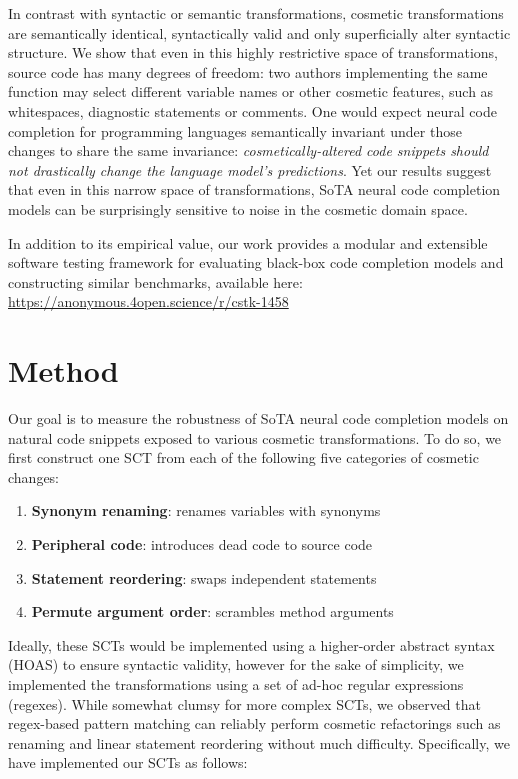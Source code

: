\documentclass[usenames,dvipsnames]{article} %
\begin{document}
  In contrast with syntactic or semantic transformations, cosmetic transformations are semantically identical, syntactically valid and only superficially alter syntactic structure. We show that even in this highly restrictive space of transformations, source code has many degrees of freedom: two authors implementing the same function may select different variable names or other cosmetic features, such as whitespaces, diagnostic statements or comments. One would expect neural code completion for programming languages semantically invariant under those changes to share the same invariance: \textit{cosmetically-altered code snippets should not drastically change the language model's predictions}. Yet our results suggest that even in this narrow space of transformations, SoTA neural code completion models can be surprisingly sensitive to noise in the cosmetic domain space.

  In addition to its empirical value, our work provides a modular and extensible software testing framework for evaluating black-box code completion models and constructing similar benchmarks, available here: \url{https://anonymous.4open.science/r/cstk-1458}

  \section{Method}

  Our goal is to measure the robustness of SoTA neural code completion models on natural code snippets exposed to various cosmetic transformations. To do so, we first construct one SCT from each of the following five categories of cosmetic changes:

  \begin{enumerate}[itemsep=1ex]
    \item \textbf{Synonym renaming}: renames variables with synonyms
    \item \textbf{Peripheral code}: introduces dead code to source code
    \item \textbf{Statement reordering}: swaps independent statements
    \item \textbf{Permute argument order}: scrambles method arguments
  \end{enumerate}

  Ideally, these SCTs would be implemented using a higher-order abstract syntax (HOAS) to ensure syntactic validity, however for the sake of simplicity, we implemented the transformations using a set of ad-hoc regular expressions (regexes). While somewhat clumsy for more complex SCTs, we observed that regex-based pattern matching can reliably perform cosmetic refactorings such as renaming and linear statement reordering without much difficulty. Specifically, we have implemented our SCTs as follows:
\end{document}
